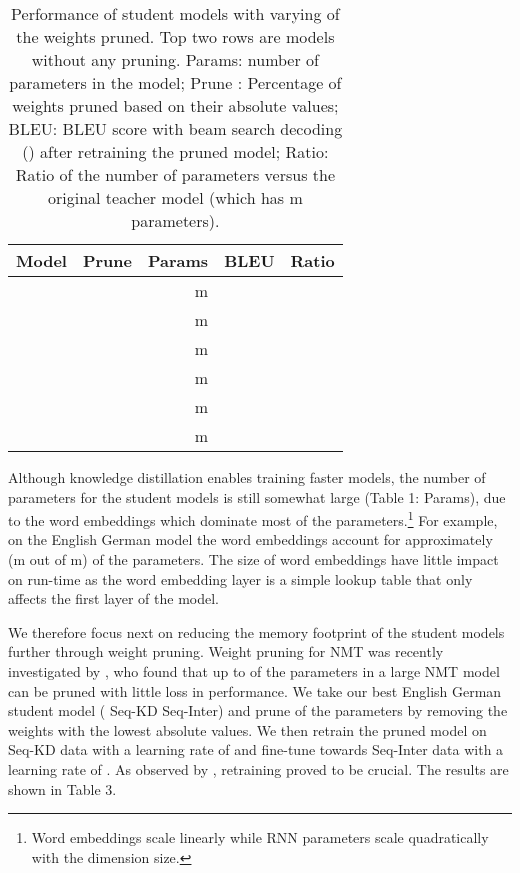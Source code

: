 \documentclass[11pt,letterpaper]{article}
\begin{document}
\begin{table}[t] \label{prune}
\centering
\small
\begin{tabular}{l  r  r c  r }
\toprule
Model & Prune  & Params & BLEU & Ratio \\
\midrule 
 &  & m& &    \\
 &  &  m& &    \\
\midrule
 & &  m&   &  \\
 &  &  m&   &  \\
 &  &  m&   &  \\
 &  &  m &    &  \\

\bottomrule
\end{tabular}
\caption{Performance of student models with varying  of the weights pruned. Top two
rows are models without any pruning.
Params: number of parameters in the model; Prune : Percentage of weights pruned based on their absolute values;
BLEU: BLEU score with beam search decoding () after retraining the pruned model; 
Ratio: Ratio of the number of parameters versus the original teacher model 
(which has m parameters).
}
\end{table}

Although knowledge distillation enables training faster models,
the number of parameters for the student models is still somewhat
large (Table 1: Params), due to the word embeddings which dominate most of the parameters.\footnote{Word
embeddings scale linearly while RNN parameters scale quadratically with the dimension size.}
For example, on the  English  German model
the word embeddings account for approximately  (m out of m) of the parameters.
The size of word embeddings have little impact on run-time as the word embedding layer is
 a simple lookup table that only affects the first layer of the model.

We therefore focus next on reducing the memory footprint of the student models further through 
weight pruning. Weight pruning for NMT was recently investigated by , who found that up to 
 of the parameters in a large NMT model can be pruned with little loss in performance.
We take our best 
English  German student model ( Seq-KD  Seq-Inter) and prune  of the parameters by removing
the weights with the lowest absolute values.
We then retrain the pruned model on Seq-KD data with a learning rate of  
and fine-tune towards Seq-Inter data with a learning rate of . As observed by ,
retraining proved to be crucial. The results are shown in Table 3. 
\end{document}
